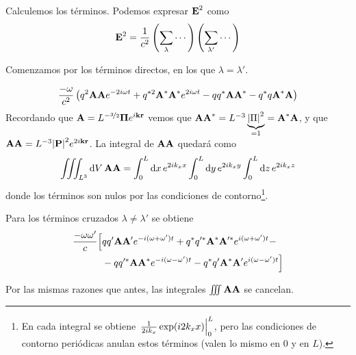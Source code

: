 Calculemos los términos. Podemos expresar $\bm{\mathrm{E}}^2$ como
\begin{equation}
  \bm{\mathrm{E}}^2 =  \frac{1}{c^2} \left( \sum_{\lambda} \cdots \right) \left( \sum_{\lambda'} \cdots \right)
\end{equation}

Comenzamos por los términos directos, en los que $\lambda=\lambda'$.

\begin{equation}
  \frac{-\omega}{c^2} \left( q^2 \bm{\mathrm{A}} \bm{\mathrm{A}}
    e^{-2i\omega t} + q^{*2} \bm{\mathrm{A}}^*  \bm{\mathrm{A}}^*
    e^{2i\omega t} - qq^* \bm{\mathrm{A}}\bm{\mathrm{A}}^* - q^*q \bm{\mathrm{A}}^* \bm{\mathrm{A}} \right)
\end{equation}
Recordando que $\bm{\mathrm{A}}=L^{-\nicefrac{3}{2}} \bm{\mathrm{\Pi}} e^{i
  \bm{\mathrm{k}}\bm{\mathrm{r}}}$ vemos que $\bm{\mathrm{A}}\bm{\mathrm{A}}^* = L^{-3}
\underbrace{\abs{\Pi}^2}_{=1} = \bm{\mathrm{A}}^* \bm{\mathrm{A}}$, y que
$\bm{\mathrm{A}}\bm{\mathrm{A}} = L^{-3} \abs{\bm{\mathrm{P}}}^2 e^{2 i
  \bm{\mathrm{k}}\bm{\mathrm{r}}}$. La integral de $\bm{\mathrm{A}}\bm{\mathrm{A}}$
quedará como
\begin{equation}
  \int\!\!\!\int\!\!\!\int_{L^3} \dd{V} \bm{\mathrm{A}} \bm{\mathrm{A}} = \int_0^L \dd{x} e^{2i
    k_x x} \int_0^L \dd{y} e^{2i
    k_x y}  \int_0^L \dd{z} e^{2i
    k_x z}
\end{equation}
donde los términos son nulos por las condiciones de
contorno\footnote{En cada integral se obtiene $\eval{\frac{1}{2ik_x}
    \exp(i2k_xx)}_0^L$, pero las condiciones de contorno periódicas
  anulan estos términos (valen lo mismo en $0$ y en $L$).}.

Para los términos cruzados $\lambda\neq\lambda'$ se obtiene
\begin{equation}
  \begin{split}
    \frac{-\omega\omega'}{c} \Big[& qq' \bm{\mathrm{A}}\bm{\mathrm{A}}'
    e^{-i(\omega+\omega')t} + q^* q'^{*} \bm{\mathrm{A}}^*
    \bm{\mathrm{A}}'^{*} e^{i(\omega+\omega')t} -\\
    &- q q'^* \bm{\mathrm{A}} \bm{\mathrm{A}}^{*} e^{-i(\omega-\omega')t} - q^*
    q' \bm{\mathrm{A}}^* \bm{\mathrm{A}}' e^{i(\omega-\omega')t} \Big]
  \end{split}
\end{equation}

Por las mismas razones que antes, las integrales $\int\!\!\!\int\!\!\!\int
\bm{\mathrm{A}}\bm{\mathrm{A}}$ se cancelan.

